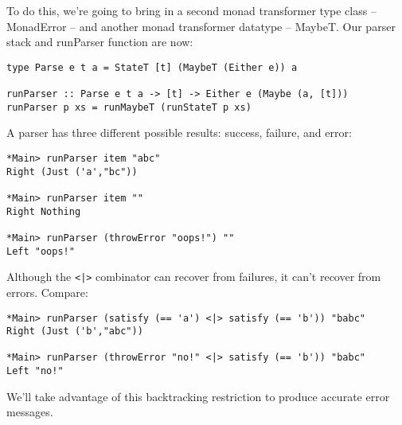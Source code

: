 \documentclass{tmr}
\begin{document}
To do this, we're going to bring in a second monad transformer type class -- MonadError -- and
another monad transformer datatype -- MaybeT.  Our parser stack and runParser function are now:
\begin{verbatim}
type Parse e t a = StateT [t] (MaybeT (Either e)) a

runParser :: Parse e t a -> [t] -> Either e (Maybe (a, [t]))
runParser p xs = runMaybeT (runStateT p xs)
\end{verbatim}

A parser has three different possible results:  success, failure, and error:
\begin{verbatim}
*Main> runParser item "abc"
Right (Just ('a',"bc"))

*Main> runParser item ""
Right Nothing

*Main> runParser (throwError "oops!") ""
Left "oops!"
\end{verbatim}
Although the \verb+<|>+ combinator can recover from failures, it can't recover from
errors.  Compare:
\begin{verbatim}
*Main> runParser (satisfy (== 'a') <|> satisfy (== 'b')) "babc"
Right (Just ('b',"abc"))

*Main> runParser (throwError "no!" <|> satisfy (== 'b')) "babc"
Left "no!"
\end{verbatim}
We'll take advantage of this backtracking restriction to produce accurate error
messages.
\end{document}
